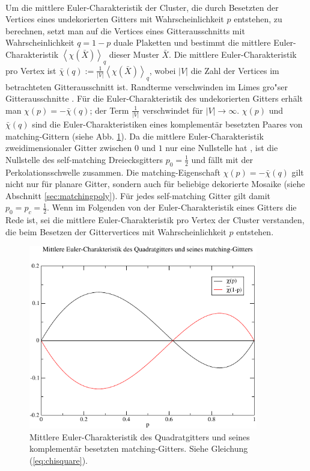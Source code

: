 \\Um die mittlere Euler-Charakteristik der Cluster, die durch Besetzten der Vertices eines undekorierten Gitters mit Wahrscheinlichkeit $p$ entstehen, zu berechnen, setzt man auf die Vertices eines Gitterausschnitts mit Wahrscheinlichkeit $q=1-p$ duale Plaketten und bestimmt die mittlere Euler-Charakteristik $\left<\chi(\bar{X})\right>_q$ dieser Muster $\bar{X}$. Die mittlere Euler-Charakteristik pro Vertex ist $\bar{\chi}(q):=\frac{1}{|V|}\left<\chi(\bar{X})\right>_q$, wobei $|V|$ die Zahl der Vertices im betrachteten Gitterausschnitt ist. Randterme verschwinden im Limes gro"ser Gitterausschnitte \cite{Jung:00}. F\"ur die Euler-Charakteristik des undekorierten Gitters erh\"alt man $\chi(p)=-\bar{\chi}(q)$; der Term $\frac{1}{|V|}$ verschwindet f\"ur $|V|\rightarrow \infty$. $\chi(p)$ und $\bar{\chi}(q)$ sind die Euler-Charakteristiken eines komplement\"ar besetzten Paares von matching-Gittern (siehe Abb. \ref{fig:chi}). Da die mittlere Euler-Charakteristik zweidimensionaler Gitter zwischen $0$ und $1$ nur eine Nullstelle hat \cite{Wagner:02}, ist die Nullstelle des self-matching Dreiecksgitters $p_0=\frac{1}{2}$ und f\"allt mit der Perkolationsschwelle zusammen. Die matching-Eigenschaft $\chi(p)=-\bar{\chi}(q)$ gilt nicht nur f\"ur planare Gitter, sondern auch f\"ur beliebige dekorierte Mosaike (siehe Abschnitt \ref{sec:matchingpoly}). F\"ur jedes self-matching Gitter gilt damit $p_0=p_c=\frac{1}{2}$. Wenn im Folgenden von der Euler-Charakteristik eines Gitters die Rede ist, sei die mittlere Euler-Charakteristik pro Vertex der Cluster verstanden, die beim Besetzen der Gittervertices mit Wahrscheinlichkeit $p$ entstehen. 
\begin{figure}[bp]
  \centering
  \includegraphics[width=10cm]{./Euler-figs/chi_fig}
  \caption{Mittlere Euler-Charakteristik des Quadratgitters und seines komplement\"ar besetzten matching-Gitters. Siehe Gleichung (\ref{eq:chisquare}).}
  \label{fig:chi}
\end{figure}
